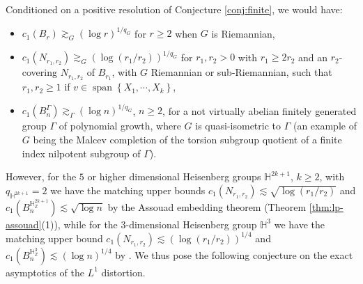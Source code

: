 \documentclass[11pt,reqno]{amsart}
\newcommand{\1}{\mathbf 1}
\begin{document}
Conditioned on a positive resolution of Conjecture \ref{conj:finite}, we would have:
\begin{itemize}
\item $c_1\left(B_r\right)\gtrsim_G \left(\log r\right)^{1/q_G}$ for $r\ge 2$ when $G$ is Riemannian,
\item $c_1\left(N_{r_1,r_2}\right)\gtrsim_G \left(\log \left(r_1/r_2\right)\right)^{1/q_G}$ for $r_1,r_2>0$ with $r_1\ge 2r_2$ and an $r_2$-covering $N_{r_1,r_2}$ of $B_{r_1}$, with $G$ Riemannian or sub-Riemannian, such that $r_1,r_2\ge 1$ if $v\in \operatorname{span}\left\{X_1,\cdots,X_k\right\}$,
\item $c_1\left(B_n^\Gamma\right)\gtrsim_\Gamma \left(\log n\right)^{1/q_G}$, $n\ge 2$, for a not virtually abelian finitely generated group $\Gamma$ of polynomial growth, where $G$ is quasi-isometric to $\Gamma$ (an example of $G$ being the Malcev completion of the torsion subgroup quotient of a finite index nilpotent subgroup of $\Gamma$).
\end{itemize}
However, for the $5$ or higher dimensional Heisenberg groups $\mathbb{H}^{2k+1}$, $k\ge 2$, with $q_{\mathbb{H}^{2k+1}}=2$ we have the matching upper bounds $c_1\left(N_{r_1,r_2}\right)\lesssim \sqrt{\log \left(r_1/r_2\right)}$ and $c_1\left(B_n^{\mathbb{H}^{2k+1}_\mathbb{Z}}\right)\lesssim \sqrt{\log n}$  by the Assouad embedding theorem (Theorem \ref{thm:lp-assouad}(1)), while for the $3$-dimensional Heisenberg group $\mathbb{H}^3$ we have the matching upper bound $c_1\left(N_{r_1,r_2}\right)\lesssim \left(\log \left(r_1/r_2\right)\right)^{1/4}$ and $c_1\left(B_n^{\mathbb{H}^{3}_\mathbb{Z}}\right)\lesssim \left(\log n\right)^{1/4}$ by \cite[Theorem 3.1]{naor2022foliated}. We thus pose the following conjecture on the exact asymptotics of the $L^1$ distortion.
\end{document}
